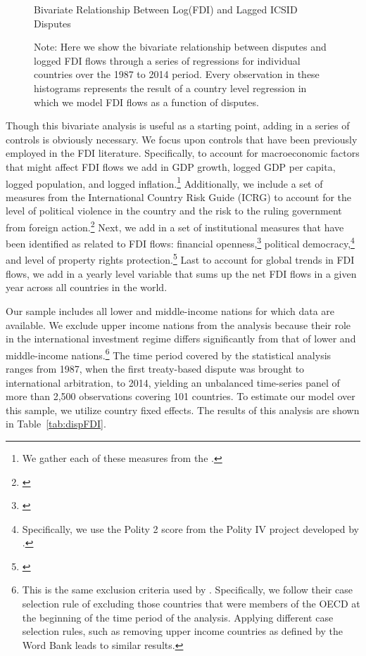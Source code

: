 \documentclass[12pt,onesided]{amsart}
\begin{document}
\begin{figure}[ht]
	\centering
	\caption{Bivariate Relationship Between Log(FDI) and Lagged ICSID Disputes}
	\label{fig:corrFDI}
	\resizebox{1\textwidth}{!}{}	
	\caption*{Note: Here we show the bivariate relationship between disputes and logged FDI flows through a series of regressions for individual countries over the 1987 to 2014 period. Every observation in these histograms represents the result of a country level regression in which we model FDI flows as a function of disputes.}
\end{figure}
\FloatBarrier

Though this bivariate analysis is useful as a starting point, adding in a series of controls is obviously necessary. We focus upon controls that have been previously employed in the FDI literature. Specifically, to account for macroeconomic factors that might affect FDI flows we add in GDP growth, logged GDP per capita, logged population, and logged inflation.\footnote{We gather each of these measures from the \citet{worldbank:2013}.} Additionally, we include a set of measures from the International Country Risk Guide (ICRG) to account for the level of political violence in the country and the risk to the ruling government from foreign action.\footnote{\citet{prs:2013}} Next, we add in a set of institutional measures that have been identified as related to FDI flows: financial openness,\footnote{\citet{chinn:ito:2008}} political democracy,\footnote{Specifically, we use the Polity 2 score from the Polity IV project developed by \citet{marshall2013polity}.} and level of property rights protection.\footnote{\citet{prs:2013}} Last to account for global trends in FDI flows, we add in a yearly level variable that sums up the net FDI flows in a given year across all countries in the world.

Our sample includes all lower and middle-income nations for which data are available. We exclude upper income nations from the analysis because their role in the international investment regime differs significantly from that of lower and middle-income nations.\footnote{This is the same exclusion criteria used by \citet{allee:peinhardt:2011}. Specifically, we follow their case selection rule of excluding those countries that were members of the OECD at the beginning of the time period of the analysis. Applying different case selection rules, such as removing upper income countries as defined by the Word Bank leads to similar results.} The time period covered by the statistical analysis ranges from 1987, when the first treaty-based dispute was brought to international arbitration, to 2014, yielding an unbalanced time-series panel of more than 2,500 observations covering 101 countries. To estimate our model over this sample, we utilize country fixed effects. The results of this analysis are shown in Table~\ref{tab:dispFDI}.
\end{document}
